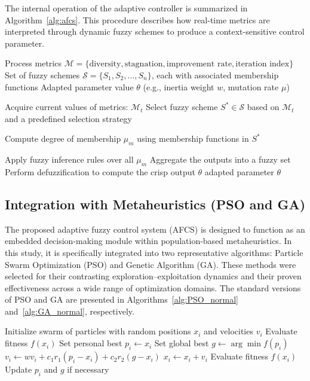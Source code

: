 The internal operation of the adaptive controller is summarized in Algorithm~\ref{alg:afcs}. This procedure describes how real-time metrics are interpreted through dynamic fuzzy schemes to produce a context-sensitive control parameter.

\begin{algorithm}[H]
\caption{Adaptive Fuzzy Control System (AFCS)} \label{alg:afcs}
\begin{algorithmic}[1]
\Require Process metrics $\mathcal{M} = \{\text{diversity}, \text{stagnation}, \text{improvement rate}, \text{iteration index}\}$
\Require Set of fuzzy schemes $\mathcal{S} = \{S_1, S_2, \dots, S_n\}$, each with associated membership functions
\Ensure Adapted parameter value $\theta$ (e.g., inertia weight $w$, mutation rate $\mu$)

\State Acquire current values of metrics: $\mathcal{M}_t$
\State Select fuzzy scheme $S^* \in \mathcal{S}$ based on $\mathcal{M}_t$ and a predefined selection strategy

    \State Compute degree of membership $\mu_m$ using membership functions in $S^*$
\EndFor

\State Apply fuzzy inference rules over all $\mu_m$
\State Aggregate the outputs into a fuzzy set
\State Perform defuzzification to compute the crisp output $\theta$
\State \Return adapted parameter $\theta$
\end{algorithmic}
\end{algorithm}

\subsection{Integration with Metaheuristics (PSO and GA)}
The proposed adaptive fuzzy control system (AFCS) is designed to function as an embedded decision-making module within population-based metaheuristics. In this study, it is specifically integrated into two representative algorithms: Particle Swarm Optimization (PSO) and Genetic Algorithm (GA). These methods were selected for their contrasting exploration–exploitation dynamics and their proven effectiveness across a wide range of optimization domains. The standard versions of PSO and GA are presented in Algorithms~\ref{alg:PSO_normal} and~\ref{alg:GA_normal}, respectively.

\begin{algorithm}[H]
\caption{Standard Particle Swarm Optimization (PSO)} \label{alg:PSO_normal}
\begin{algorithmic}[1]
\State Initialize swarm of particles with random positions $x_i$ and velocities $v_i$
    \State Evaluate fitness $f(x_i)$
    \State Set personal best $p_i \gets x_i$
\EndFor
\State Set global best $g \gets \arg\min f(p_i)$
        \State $v_i \gets w v_i + c_1 r_1 (p_i - x_i) + c_2 r_2 (g - x_i)$
        \State $x_i \gets x_i + v_i$
        \State Evaluate fitness $f(x_i)$
        \State Update $p_i$ and $g$ if necessary
    \EndFor
\EndWhile
\end{algorithmic}
\end{algorithm}

